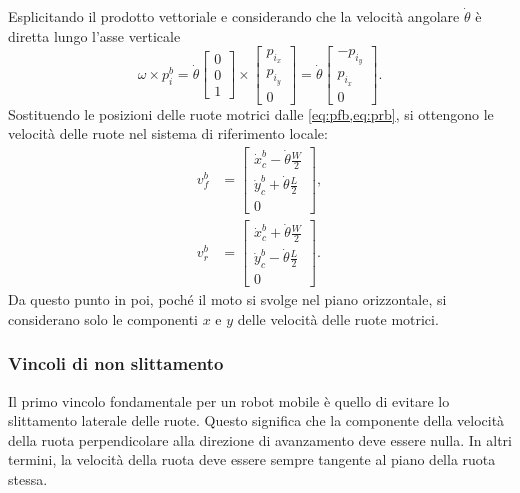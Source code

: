 Esplicitando il prodotto vettoriale e considerando che la velocità angolare $\dot{\theta}$ è diretta lungo l'asse verticale
\begin{equation}\label{eq:cross_product}
    \omega \times p_i^b = \dot{\theta} \begin{bmatrix}
        0 \\
        0 \\
        1
    \end{bmatrix} \times \begin{bmatrix}
        p_{i_x} \\
        p_{i_y} \\
        0
    \end{bmatrix} = \dot{\theta} \begin{bmatrix}
        -p_{i_y} \\
        p_{i_x}  \\
        0
    \end{bmatrix}.
\end{equation}
Sostituendo le posizioni delle ruote motrici dalle \cref{eq:pfb,eq:prb}, si ottengono le velocità delle ruote nel sistema di riferimento locale:
\begin{align}
    v_f^b & = \begin{bmatrix}
                  \dot{x}_c^b - \dot{\theta} \frac{W}{2} \\
                  \dot{y}_c^b + \dot{\theta} \frac{L}{2} \\
                  0
              \end{bmatrix}, \label{eq:vfb} \\
    v_r^b & = \begin{bmatrix}
                  \dot{x}_c^b + \dot{\theta} \frac{W}{2} \\
                  \dot{y}_c^b - \dot{\theta} \frac{L}{2} \\
                  0
              \end{bmatrix}.\label{eq:vrb}
\end{align}
Da questo punto in poi, poché il moto si svolge nel piano orizzontale, si considerano solo le componenti $x$ e $y$ delle velocità delle ruote motrici.
\subsubsection{Vincoli di non slittamento}
Il primo vincolo fondamentale per un robot mobile è quello di evitare lo slittamento laterale delle ruote. Questo significa che la componente della velocità della ruota perpendicolare alla direzione di avanzamento deve essere nulla. In altri termini, la velocità della ruota deve essere sempre tangente al piano della ruota stessa.

